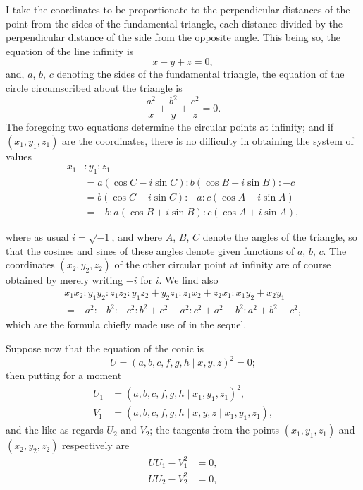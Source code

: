 \documentclass[11pt,a4paper]{article}
\begin{document}
I take the coordinates to be proportionate to the perpendicular distances of the point from the sides of the fundamental triangle, each distance divided by the perpendicular distance of the side from the opposite angle. This being so, the equation of the line infinity is
\[
x + y + z = 0,
\]
and, $a$, $b$, $c$ denoting the sides of the fundamental triangle, the equation of the circle circumscribed about the triangle is
\[
\frac{a^2}{x} + \frac{b^2}{y} + \frac{c^2}{z} = 0.
\]
The foregoing two equations determine the circular points at infinity; and if $(x_1, y_1, z_1)$ are the coordinates, there is no difficulty in obtaining the system of values
\begin{align*}
x_1 &: y_1 : z_1\\
&= a(\cos C - i \sin C) : b(\cos B + i \sin B) : -c\\
&= b(\cos C + i \sin C) : -a : c(\cos A - i \sin A)\\
&= -b : a(\cos B + i \sin B) : c(\cos A + i \sin A),
\end{align*}

\newpage
\setcounter{page}{506}

where as usual $i = \sqrt{-1}$, and where $A$, $B$, $C$ denote the angles of the triangle, so that the cosines and sines of these angles denote given functions of $a$, $b$, $c$. The coordinates $(x_2, y_2, z_2)$ of the other circular point at infinity are of course obtained by merely writing $-i$ for $i$. We find also
\begin{multline*}
x_1x_2 : y_1y_2 : z_1z_2 : y_1z_2 + y_2z_1 : z_1x_2 + z_2x_1 : x_1y_2 + x_2y_1\\
= -a^2 : -b^2 : -c^2 : b^2 + c^2 - a^2 : c^2 + a^2 - b^2 : a^2 + b^2 - c^2,
\end{multline*}
which are the formula chiefly made use of in the sequel.

Suppose now that the equation of the conic is
\[
U = (a, b, c, f, g, h \mid x, y, z)^2 = 0;
\]
then putting for a moment
\begin{align*}
U_1 &= (a, b, c, f, g, h \mid x_1, y_1, z_1)^2,\\
V_1 &= (a, b, c, f, g, h \mid x, y, z \mid x_1, y_1, z_1),
\end{align*}
and the like as regards $U_2$ and $V_2$; the tangents from the points $(x_1, y_1, z_1)$ and $(x_2, y_2, z_2)$ respectively are
\begin{align*}
UU_1 - V_1^2 &= 0,\\
UU_2 - V_2^2 &= 0,
\end{align*}
\end{document}
